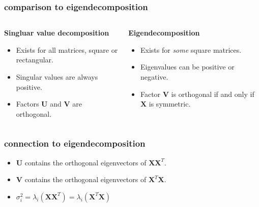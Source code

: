 \documentclass[compress]{beamer}
\newcommand{\bv}[1]{\mathbf{#1}}
\begin{document}
\begin{frame}
		\frametitle{comparison to eigendecomposition}
		\begin{columns}
			\begin{column}{.5\textwidth}
				\begin{center}
					\textbf{Singluar value decomposition}
				\end{center}
			\begin{itemize}
				\item Exists for all matrices, square or rectangular.
				\item Singular values are always positive.
				\item Factors $\bv{U}$ and $\bv{V}$ are orthogonal.
			\end{itemize}
			\end{column}
			\begin{column}{.5\textwidth}
					\begin{center}
					\textbf{Eigendecomposition}
					\end{center}
		\begin{itemize}
			\item Exists for \emph{some} square matrices.
			\item Eigenvalues can be positive or negative.
			\item Factor $\bv{V}$ is orthogonal if and only if $\bv{X}$ is symmetric.
		\end{itemize}
				\end{column}
		\end{columns}
\end{frame}

\begin{frame}[t]
	\frametitle{connection to eigendecomposition}
	\begin{itemize}
		\item $\bv{U}$ contains the orthogonal eigenvectors of $\bv{X}\bv{X}^T$. 
		\item $\bv{V}$ contains the orthogonal eigenvectors of $\bv{X}^T\bv{X}$. 
		\item $\sigma_i^2 = \lambda_i(\bv{X}\bv{X}^T) = \lambda_i(\bv{X}^T\bv{X})$
	\end{itemize}
	
\end{frame}
\end{document}
